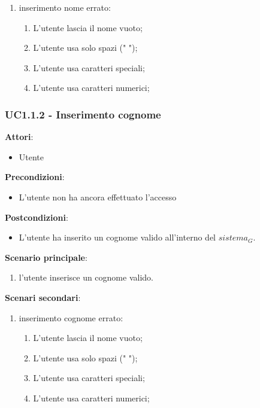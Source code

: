 \begin{enumerate}
    \item inserimento nome errato:
    \begin{enumerate}
        \item L'utente lascia il nome vuoto;
        \item L'utente usa solo spazi (" ");
        \item L'utente usa caratteri speciali;
        \item L'utente usa caratteri numerici;
    \end{enumerate}

\end{enumerate}


\subsubsection{UC1.1.2 - Inserimento cognome}\label{usecase:1_1_2}
\textbf{Attori}:
\begin{itemize}
    \item Utente
\end{itemize}
\textbf{Precondizioni}:
\begin{itemize}
    \item L'utente non ha ancora effettuato l'accesso
\end{itemize}
\textbf{Postcondizioni}:
\begin{itemize}
    \item L'utente ha inserito un cognome valido all'interno del $\textit{sistema}_G$.
\end{itemize}
\textbf{Scenario principale}:
\begin{enumerate}
    \item l'utente inserisce un cognome valido.
\end{enumerate}
\textbf{Scenari secondari}:

\begin{enumerate}
    \item inserimento cognome errato:
    \begin{enumerate}
        \item L'utente lascia il nome vuoto;
        \item L'utente usa solo spazi (" ");
        \item L'utente usa caratteri speciali;
        \item L'utente usa caratteri numerici;
    \end{enumerate}    
\end{enumerate}

